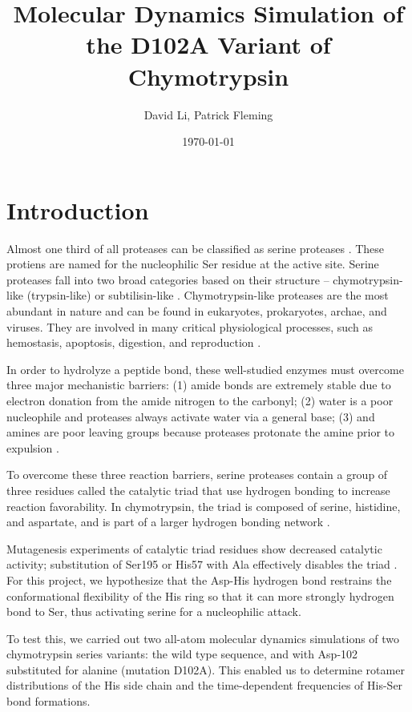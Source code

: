 \documentclass[11pt, twocolumn]{article}
\begin{document}
\title{Molecular Dynamics Simulation of the D102A Variant of Chymotrypsin}
\author{David Li, Patrick Fleming}
\date{\today}
\maketitle

\section{Introduction}
Almost one third of all proteases can be classified as serine proteases \cite{hedstrom02}.
These protiens are named for the nucleophilic Ser residue at the active site.
Serine proteases fall into two broad categories based on their structure
-- chymotrypsin-like (trypsin-like) or subtilisin-like \cite{madala10}.
Chymotrypsin-like proteases are the most abundant in nature and can be found in
eukaryotes, prokaryotes, archae, and viruses. They are involved in many critical
physiological processes, such as hemostasis, apoptosis, digestion, and reproduction
\cite{hedstrom02}.

In order to hydrolyze a peptide bond, these well-studied enzymes must overcome
three major mechanistic barriers: (1) amide bonds are extremely stable due to electron
donation from the amide nitrogen to the carbonyl; (2) water is a poor nucleophile
and proteases always activate water via a general base; (3) and amines are poor leaving
groups because proteases protonate the amine prior to expulsion \cite{hedstrom02}.

To overcome these three reaction barriers, serine proteases contain a group of three
residues called the catalytic triad that use hydrogen bonding to increase reaction favorability.
In chymotrypsin, the triad is composed of serine, histidine, and aspartate, and is part of
a larger hydrogen bonding network \cite{hedstrom02}.


Mutagenesis experiments of catalytic
triad residues show decreased catalytic activity; substitution of Ser195 or His57 with Ala
effectively disables the triad \cite{hedstrom02}. For this project, we hypothesize that
the Asp-His hydrogen bond restrains the conformational flexibility of the His ring so that
it can more strongly hydrogen bond to Ser, thus activating serine for a nucleophilic attack.

To test this, we carried out two all-atom molecular dynamics simulations of two
chymotrypsin series variants: the wild type sequence, and with Asp-102 substituted for
alanine (mutation D102A). This enabled us to determine rotamer distributions of the
His side chain and the time-dependent frequencies of His-Ser bond formations.
\end{document}
